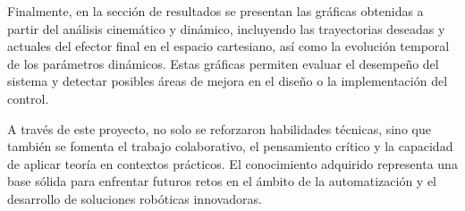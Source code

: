 Finalmente, en la sección de resultados se presentan las gráficas obtenidas a partir del análisis cinemático y dinámico, incluyendo las trayectorias deseadas y actuales del efector final en el espacio cartesiano, así como la evolución temporal de los parámetros dinámicos. Estas gráficas permiten evaluar el desempeño del sistema y detectar posibles áreas de mejora en el diseño o la implementación del control.

A través de este proyecto, no solo se reforzaron habilidades técnicas, sino que también se fomenta el trabajo colaborativo, el pensamiento crítico y la capacidad de aplicar teoría en contextos prácticos. El conocimiento adquirido representa una base sólida para enfrentar futuros retos en el ámbito de la automatización y el desarrollo de soluciones robóticas innovadoras.
